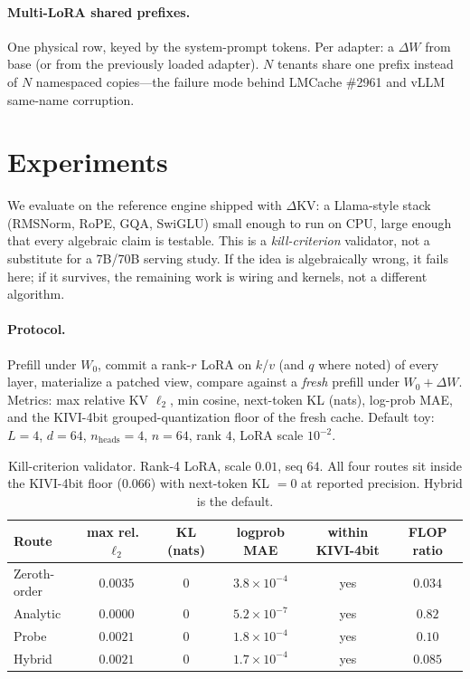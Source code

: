\documentclass{article}
\newcommand{\dkv}{$\Delta$KV}
\begin{document}
\paragraph{Multi-LoRA shared prefixes.}
One physical row, keyed by the system-prompt tokens.
Per adapter: a $\Delta W$ from base (or from the previously loaded
adapter).
$N$ tenants share one prefix instead of $N$ namespaced copies---the
failure mode behind LMCache \#2961 and vLLM same-name corruption.

\section{Experiments}
\label{sec:exp}

We evaluate on the reference engine shipped with \dkv: a Llama-style
stack (RMSNorm, RoPE, GQA, SwiGLU) small enough to run on CPU, large
enough that every algebraic claim is testable.
This is a \emph{kill-criterion} validator, not a substitute for a 7B/70B
serving study.
If the idea is algebraically wrong, it fails here; if it survives, the
remaining work is wiring and kernels, not a different algorithm.

\paragraph{Protocol.}
Prefill under $W_0$, commit a rank-$r$ LoRA on $k$/$v$ (and $q$ where
noted) of every layer, materialize a patched view, compare against a
\emph{fresh} prefill under $W_0+\Delta W$.
Metrics: max relative KV $\ell_2$, min cosine, next-token KL (nats),
log-prob MAE, and the KIVI-4bit grouped-quantization floor of the fresh
cache.
Default toy: $L{=}4$, $d{=}64$, $n_{\mathrm{heads}}{=}4$, $n{=}64$,
rank $4$, LoRA scale $10^{-2}$.

\begin{table}[t]
\centering
\caption{Kill-criterion validator. Rank-4 LoRA, scale $0.01$, seq $64$.
All four routes sit inside the KIVI-4bit floor ($0.066$) with next-token
KL $=0$ at reported precision. Hybrid is the default.}
\label{tab:bench}
\small
\begin{tabular}{@{}lccccc@{}}
\toprule
Route & max rel.\ $\ell_2$ & KL (nats) & logprob MAE & within KIVI-4bit & FLOP ratio \\
\midrule
Zeroth-order  & $0.0035$ & $0$ & $3.8{\times}10^{-4}$ & yes & $0.034$ \\
Analytic      & $0.0000$ & $0$ & $5.2{\times}10^{-7}$ & yes & $0.82$ \\
Probe         & $0.0021$ & $0$ & $1.8{\times}10^{-4}$ & yes & $0.10$ \\
Hybrid        & $0.0021$ & $0$ & $1.7{\times}10^{-4}$ & yes & $0.085$ \\
\bottomrule
\end{tabular}
\end{table}
\end{document}
